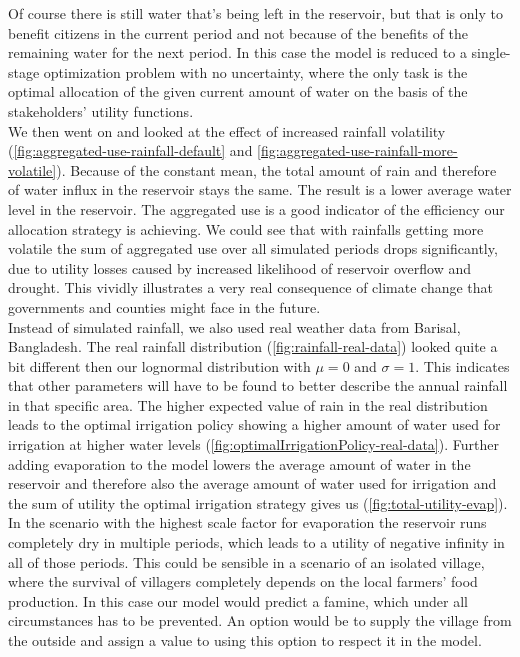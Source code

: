 \documentclass[12pt, a4paper, oneside]{article}
\begin{document}
Of course there is still water that's being left in the reservoir, but that is only to benefit citizens in the current period and not because of the benefits of the remaining water for the next period.
In this case the model is reduced to a single-stage optimization problem with no uncertainty, where the only task is the optimal allocation of the given current amount of water on the basis of the stakeholders' utility functions.
\\
We then went on and looked at the effect of increased rainfall volatility (\ref{fig:aggregated-use-rainfall-default} and \ref{fig:aggregated-use-rainfall-more-volatile}).
Because of the constant mean, the total amount of rain and therefore of water influx in the reservoir stays the same.
The result is a lower average water level in the reservoir.
The aggregated use is a good indicator of the efficiency our allocation strategy is achieving.
We could see that with rainfalls getting more volatile the sum of aggregated use over all simulated periods drops significantly, due to utility losses caused by increased likelihood of reservoir overflow and drought.
This vividly illustrates a very real consequence of climate change that governments and counties might face in the future.
\\
Instead of simulated rainfall, we also used real weather data from Barisal, Bangladesh. 
The real rainfall distribution (\ref{fig:rainfall-real-data}) looked quite a bit different then our lognormal distribution with $\mu=0$ and $\sigma=1$.
This indicates that other parameters will have to be found to better describe the annual rainfall in that specific area.
The higher expected value of rain in the real distribution leads to the optimal irrigation policy showing a higher amount of water used for irrigation at higher water levels (\ref{fig:optimalIrrigationPolicy-real-data}).
Further adding evaporation to the model lowers the average amount of water in the reservoir and therefore also the average amount of water used for irrigation and the sum of utility the optimal irrigation strategy gives us (\ref{fig:total-utility-evap}).
In the scenario with the highest scale factor for evaporation the reservoir runs completely dry in multiple periods, which leads to a utility of negative infinity in all of those periods.
This could be sensible in a scenario of an isolated village, where the survival of villagers completely depends on the local farmers' food production.
In this case our model would predict a famine, which under all circumstances has to be prevented.
An option would be to supply the village from the outside and assign a value to using this option to respect it in the model.
\end{document}
